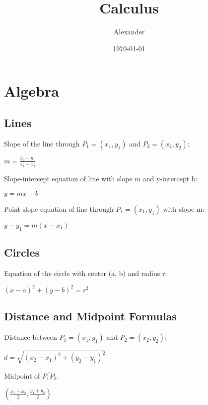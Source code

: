 \documentclass{article}
\title{Calculus}
\author{Alexander}
\date{\today}
\begin{document}
\maketitle

\section* {Algebra}
	\subsection*{Lines}
		Slope of the line through $P_1 = (x_1, y_1)$ and $P_2 = (x_2, y_2)$:
			\begin{center}
			$m = \frac{y_2 - y_1}{x_2 - x_1}$
			\end{center}
		Slope-intercept equation of line with slope m and y-intercept b:
			\begin{center}
			$y = mx + b$
			\end{center}
		Point-slope equation of line through $P_1 = (x_1, y_1)$ with slope m:
			\begin{center}
			$y - y_1 = m(x - x_1)$
			\end{center}
	\subsection*{Circles}
		Equation of the circle with center (a, b) and radius r:
			\begin{center}
			$(x - a)^2 + (y - b)^2 = r^2$
			\end{center}
	\subsection*{Distance and Midpoint Formulas}
		Distance between $P_1 = (x_1, y_1)$ and $P_2 = (x_2, y_2)$:
			\begin{center}
			$d = \sqrt{(x_2 - x_1)^2 + (y_2 - y_1)^2}$
			\end{center}
		Midpoint of $\bar{P_1P_2}$:
			\begin{center}
			$(\frac{x_1 + x_2}{2}, \frac{y_1 + y_2}{2})$
			\end{center}
\end{document}
